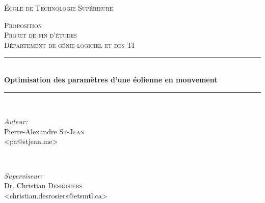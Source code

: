\documentclass[11pt]{article}
\begin{document}
\pagestyle{fancy}

\begin{titlepage}
\thispagestyle{fancy}

\newcommand{\HRule}{\rule{\linewidth}{0.5mm}} %

\center %
 

\textsc{\LARGE École de Technologie Supérieure}\\[1.5cm] %

\vfill

\textsc{\Large Proposition}\\[0.5cm] %
\textsc{\large Projet de fin d'études \\ Département de génie logiciel et des TI}\\[0.5cm] %



\HRule \\[0.4cm]
{ \huge \bfseries Optimisation des paramètres d’une éolienne en mouvement}\\[0.4cm] %
\HRule \\[1.5cm]
 
\vfill

\begin{minipage}{0.4\textwidth}
\begin{flushleft} \large
\emph{Auteur:}\\
Pierre-Alexandre \textsc{St-Jean}\\
\small{<pa@stjean.me>}
\end{flushleft}
\end{minipage}
~
\begin{minipage}{0.4\textwidth}
\begin{flushright} \large
\emph{Superviseur:} \\
Dr. Christian \textsc{Desrosiers}\\
\small{<christian.desrosiers@etsmtl.ca>}
\end{flushright}
\end{minipage}\\[4cm]


\end{titlepage}
\end{document}
